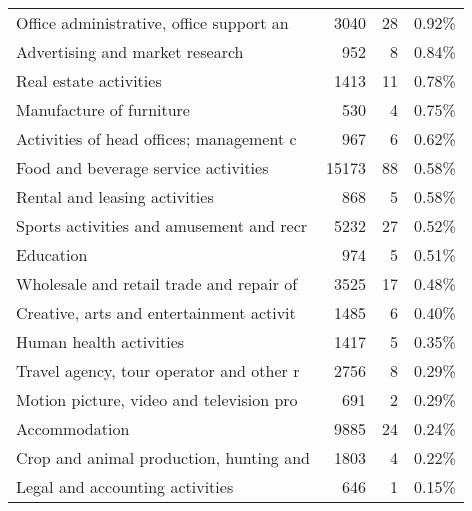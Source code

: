 \begin{tabular}{lrrl}
Office administrative, office support an &           3040 &         28 & 0.92\% \\
         Advertising and market research &            952 &          8 & 0.84\% \\
                  Real estate activities &           1413 &         11 & 0.78\% \\
                Manufacture of furniture &            530 &          4 & 0.75\% \\
Activities of head offices; management c &            967 &          6 & 0.62\% \\
    Food and beverage service activities &          15173 &         88 & 0.58\% \\
           Rental and leasing activities &            868 &          5 & 0.58\% \\
Sports activities and amusement and recr &           5232 &         27 & 0.52\% \\
                               Education &            974 &          5 & 0.51\% \\
Wholesale and retail trade and repair of &           3525 &         17 & 0.48\% \\
Creative, arts and entertainment activit &           1485 &          6 & 0.40\% \\
                 Human health activities &           1417 &          5 & 0.35\% \\
Travel agency, tour operator and other r &           2756 &          8 & 0.29\% \\
Motion picture, video and television pro &            691 &          2 & 0.29\% \\
                           Accommodation &           9885 &         24 & 0.24\% \\
Crop and animal production, hunting and  &           1803 &          4 & 0.22\% \\
         Legal and accounting activities &            646 &          1 & 0.15\% \\
\bottomrule
\end{tabular}
